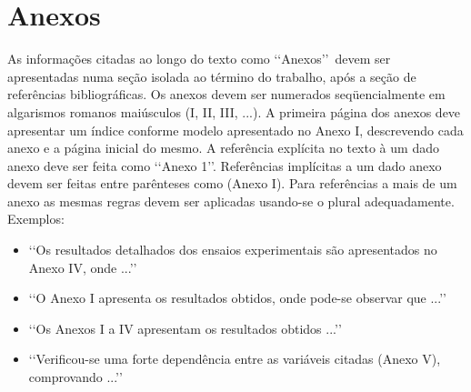 \section{Anexos}
As informações citadas ao longo do texto como \lq\lq Anexos\rq\rq\ devem ser
apresentadas numa seção isolada ao término do trabalho, após a seção de
referências bibliográficas. Os anexos devem ser numerados seqüencialmente em
algarismos romanos maiúsculos (I, II, III, ...). A primeira página dos anexos
deve apresentar um índice conforme modelo apresentado no Anexo I, descrevendo
cada anexo e a página inicial do mesmo.
A referência explícita no texto à um dado anexo deve ser feita como
\lq\lq Anexo 1\rq\rq. Referências implícitas a um dado anexo devem ser feitas
entre parênteses como (Anexo I). Para referências a mais de um anexo as mesmas
regras devem ser aplicadas usando-se o plural adequadamente. Exemplos:
\begin{itemize}
\item \lq\lq Os resultados detalhados dos ensaios experimentais são
apresentados no Anexo IV, onde ...\rq\rq
\item \lq\lq O Anexo I apresenta os resultados obtidos, onde pode-se
observar que ...\rq\rq
\item \lq\lq Os Anexos I a IV apresentam os resultados obtidos ...\rq\rq
\item \lq\lq Verificou-se uma forte dependência entre as variáveis citadas
(Anexo V), comprovando ...\rq\rq
\end{itemize}
